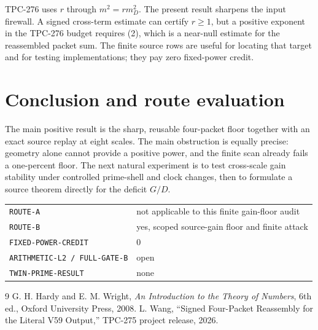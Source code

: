 \documentclass[11pt]{article}
\begin{document}
TPC-276 uses $r$ through $m^2=r m_D^2$.  The present result sharpens the
input firewall.  A signed cross-term estimate can certify $r\geq1$, but a
positive exponent in the TPC-276 budget requires (2), which is a near-null
estimate for the reassembled packet sum.  The finite source rows are useful
for locating that target and for testing implementations; they pay zero
fixed-power credit.

\section{Conclusion and route evaluation}

The main positive result is the sharp, reusable four-packet floor together
with an exact source replay at eight scales.  The main obstruction is equally
precise: geometry alone cannot provide a positive power, and the finite scan
already fails a one-percent floor.  The next natural experiment is to test
cross-scale gain stability under controlled prime-shell and clock changes,
then to formulate a source theorem directly for the deficit $G/D$.

\begin{center}
\begin{tabular}{ll}
\texttt{ROUTE-A} & not applicable to this finite gain-floor audit\\
\texttt{ROUTE-B} & yes, scoped source-gain floor and finite attack\\
\texttt{FIXED-POWER-CREDIT} & 0\\
\texttt{ARITHMETIC-L2 / FULL-GATE-B} & open\\
\texttt{TWIN-PRIME-RESULT} & none
\end{tabular}
\end{center}

\begin{thebibliography}{9}
 G. H. Hardy and E. M. Wright, \emph{An Introduction to the
Theory of Numbers}, 6th ed., Oxford University Press, 2008.
 L. Wang, ``Signed Four-Packet Reassembly for the Literal
V59 Output,'' TPC-275 project release, 2026.
\end{thebibliography}
\end{document}

